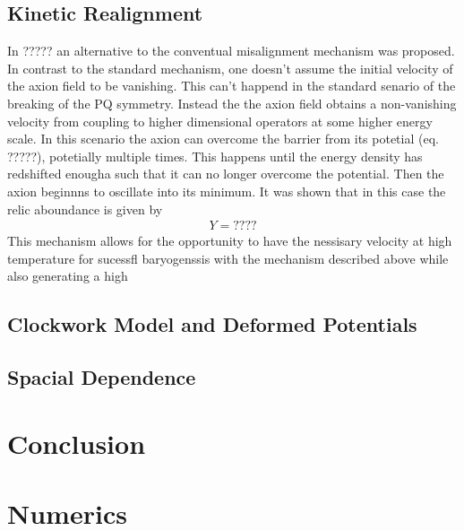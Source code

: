 \documentclass[13pt,a4paper,twoside,titlepage]{article}
\begin{document}
\subsection{Kinetic Realignment}
In ????? an alternative to the conventual misalignment mechanism was proposed.
In contrast to the standard mechanism, one doesn't assume the initial velocity of the axion field to be vanishing.
This can't happend in the standard senario of the breaking of the PQ symmetry.
Instead the the axion field obtains a non-vanishing velocity from coupling to higher
dimensional operators at some higher energy scale.
In this scenario the axion can overcome the barrier from its potetial (eq. ?????),
potetially multiple times.
This happens until the energy density has redshifted enougha such that it can no longer
overcome the potential. Then the axion beginnns to oscillate into its minimum.
It was shown that in this case the relic aboundance is given by
\begin{align}
    Y = ????
\end{align}
This mechanism allows for the opportunity to have the nessisary velocity at high temperature for sucessfl baryogenssis with the mechanism described above while also
generating a high

\subsection{Clockwork Model and Deformed Potentials}

\subsection{Spacial Dependence}


\section{Conclusion}
\label{sec:conclusion}


\appendix

\section{Numerics}


\newpage
\printbibliography
\end{document}
